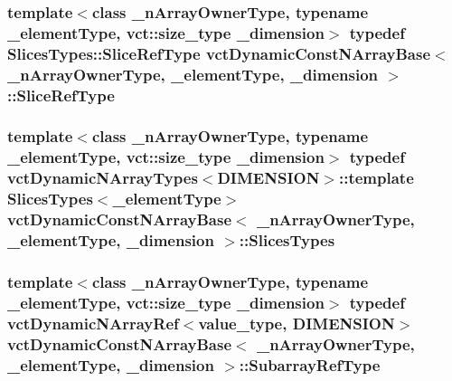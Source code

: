\subsubsection[{Slice\+Ref\+Type}]{\setlength{\rightskip}{0pt plus 5cm}template$<$class \+\_\+n\+Array\+Owner\+Type, typename \+\_\+element\+Type, vct\+::size\+\_\+type \+\_\+dimension$>$ typedef Slices\+Types\+::\+Slice\+Ref\+Type {\bf vct\+Dynamic\+Const\+N\+Array\+Base}$<$ \+\_\+n\+Array\+Owner\+Type, \+\_\+element\+Type, \+\_\+dimension $>$\+::{\bf Slice\+Ref\+Type}}\label{classvct_dynamic_const_n_array_base_a4170184942c320b2402ba8dfdab9a915}
\hypertarget{classvct_dynamic_const_n_array_base_a1f4ce8ed9fda0d5d1704f66799a55279}{}
\subsubsection[{Slices\+Types}]{\setlength{\rightskip}{0pt plus 5cm}template$<$class \+\_\+n\+Array\+Owner\+Type, typename \+\_\+element\+Type, vct\+::size\+\_\+type \+\_\+dimension$>$ typedef {\bf vct\+Dynamic\+N\+Array\+Types}$<${\bf D\+I\+M\+E\+N\+S\+I\+O\+N}$>$\+::template {\bf Slices\+Types}$<$\+\_\+element\+Type$>$ {\bf vct\+Dynamic\+Const\+N\+Array\+Base}$<$ \+\_\+n\+Array\+Owner\+Type, \+\_\+element\+Type, \+\_\+dimension $>$\+::{\bf Slices\+Types}}\label{classvct_dynamic_const_n_array_base_a1f4ce8ed9fda0d5d1704f66799a55279}
\hypertarget{classvct_dynamic_const_n_array_base_a4db8630795191b1854a5af85b9327ee3}{}
\subsubsection[{Subarray\+Ref\+Type}]{\setlength{\rightskip}{0pt plus 5cm}template$<$class \+\_\+n\+Array\+Owner\+Type, typename \+\_\+element\+Type, vct\+::size\+\_\+type \+\_\+dimension$>$ typedef {\bf vct\+Dynamic\+N\+Array\+Ref}$<$value\+\_\+type, {\bf D\+I\+M\+E\+N\+S\+I\+O\+N}$>$ {\bf vct\+Dynamic\+Const\+N\+Array\+Base}$<$ \+\_\+n\+Array\+Owner\+Type, \+\_\+element\+Type, \+\_\+dimension $>$\+::{\bf Subarray\+Ref\+Type}}\label{classvct_dynamic_const_n_array_base_a4db8630795191b1854a5af85b9327ee3}
\hypertarget{classvct_dynamic_const_n_array_base_a5123caffcf1455a1b99003877eade897}{}
